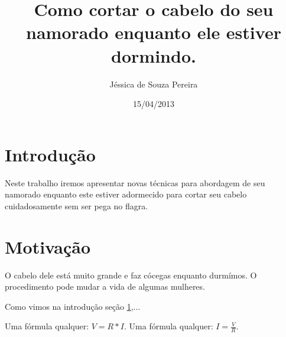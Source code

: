 \documentclass{article}
\author{Jéssica de Souza Pereira}
\date{15/04/2013}
\title{Como cortar o cabelo do seu namorado enquanto ele estiver dormindo.}
\begin{document}
\maketitle
\newpage
\section{Introdução}
\label{sec:intro}
Neste trabalho iremos apresentar novas técnicas para abordagem de seu namorado enquanto este estiver adormecido para cortar seu cabelo cuidadosamente sem ser pega no flagra.
\section{Motivação}
\label{sec:motiv}
O cabelo dele está muito grande e faz cócegas enquanto durmímos. O procedimento pode mudar a vida de algumas mulheres.

Como vimos na introdução {seção \ref{sec:intro}},...

Uma fórmula qualquer: $V = R*I$.
Uma fórmula qualquer: $I = \frac{V}{R}$.
\end{document}
